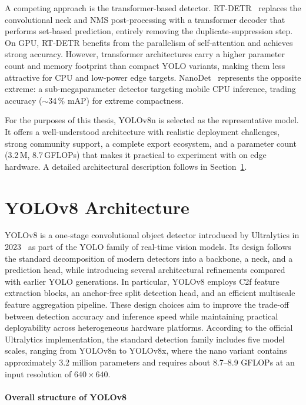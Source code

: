 \documentclass[12pt,a4paper]{report}
\begin{document}
A competing approach is the transformer-based detector.
RT-DETR~\cite{lv2023rtdetr} replaces the convolutional neck and NMS post-processing with a transformer decoder that
performs set-based prediction, entirely removing the duplicate-suppression step.
On GPU, RT-DETR benefits from the parallelism of self-attention and achieves strong accuracy.
However, transformer architectures carry a higher parameter count and memory footprint than compact YOLO variants,
making them less attractive for CPU and low-power edge targets.
NanoDet~\cite{nanodet} represents the opposite extreme: a sub-megaparameter detector targeting mobile CPU inference,
trading accuracy ($\sim$34\,\% mAP) for extreme compactness.

For the purposes of this thesis, YOLOv8n is selected as the representative model.
It offers a well-understood architecture with realistic deployment challenges, strong community support, a complete
export ecosystem, and a parameter count (3.2\,M, 8.7\,GFLOPs) that makes it practical to experiment with on edge hardware.
A detailed architectural description follows in Section~\ref{sec:yolov8}.

\section{YOLOv8 Architecture}
\label{sec:yolov8}
\noindent

YOLOv8 is a one-stage convolutional object detector introduced by Ultralytics in 2023~\cite{yolov8_ultralytics}
as part of the YOLO family of real-time vision models. Its design follows the standard decomposition of modern
detectors into a backbone, a neck, and a prediction head, while introducing several architectural refinements
compared with earlier YOLO generations. In particular, YOLOv8 employs C2f feature extraction blocks, an anchor-free
split detection head, and an efficient multiscale feature aggregation pipeline. These design choices aim to improve
the trade-off between detection accuracy and inference speed while maintaining practical deployability across
heterogeneous hardware platforms. According to the official Ultralytics implementation, the standard detection
family includes five model scales, ranging from YOLOv8n to YOLOv8x, where the nano variant contains approximately
3.2 million parameters and requires about 8.7--8.9 GFLOPs at an input resolution of $640 \times 640$.

\paragraph{Overall structure of YOLOv8}
\end{document}
